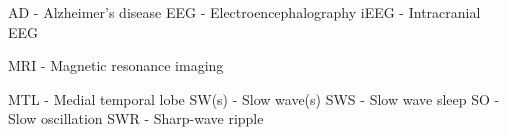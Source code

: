 AD - Alzheimer's disease
EEG - Electroencephalography
iEEG - Intracranial EEG

MRI - Magnetic resonance imaging

MTL - Medial temporal lobe
SW(s) - Slow wave(s)
SWS - Slow wave sleep
SO - Slow oscillation
SWR - Sharp-wave ripple
